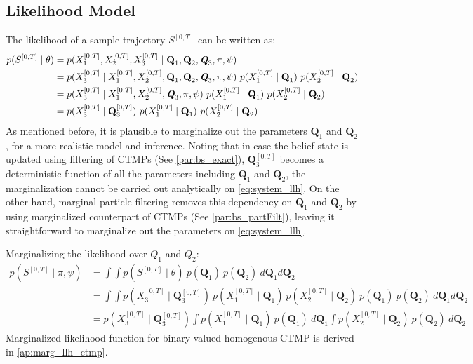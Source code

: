 \subsection{Likelihood Model}
 The likelihood of a sample trajectory $ S^{[0,T]} $ can be written as:
\begin{align}
p(S^{[0,T]} \mid \theta ) & = p(X_{1}^{[0, T]}, X_{2}^{[0, T]}, X_{3}^{[0, T]} \mid \textbf{Q}_{1}, \textbf{Q}_{2}, \textit{\textbf{Q}}_3, \pi, \psi) \nonumber\\
& = p(X_{3}^{[0, T]} \mid X_{1}^{[0, T]}, X_{2}^{[0, T]}, \textbf{Q}_{1}, \textbf{Q}_{2}, \textit{\textbf{Q}}_3, \pi, \psi) \ p(X_{1}^{[0, T]}\mid \textbf{Q}_{1}) \ p(X_{2}^{[0, T]}\mid \textbf{Q}_{2}) \nonumber\\ & = p(X_{3}^{[0, T]} \mid X_{1}^{[0, T]}, X_{2}^{[0, T]}, \textit{\textbf{Q}}_3, \pi, \psi) \ p(X_{1}^{[0, T]}\mid \textbf{Q}_{1}) \ p(X_{2}^{[0, T]}\mid \textbf{Q}_{2}) \nonumber\\ & = p(X_{3}^{[0, T]}\mid \textbf{Q}_{3}^{[0, T]}) \ p(X_{1}^{[0, T]}\mid \textbf{Q}_{1}) \ p(X_{2}^{[0, T]}\mid \textbf{Q}_{2}) 
\label{eq:system_llh}
\end{align}
As mentioned before, it is plausible to marginalize out the parameters $ \textbf{Q}_1 $ and $ \textbf{Q}_2 $, for a more realistic model and inference. Noting that in case the belief state is updated using filtering of CTMPs (See \cref{par:bs_exact}), $ \textbf{Q}_{3}^{[0, T]} $ becomes a deterministic function of all the parameters including $ \textbf{Q}_1 $ and $ \textbf{Q}_2 $, the marginalization cannot be carried out analytically on \autoref{eq:system_llh}. On the other hand, marginal particle filtering removes this dependency on $ \textbf{Q}_1 $ and $ \textbf{Q}_2 $ by using marginalized counterpart of CTMPs (See \cref{par:bs_partFilt}), leaving it straightforward to marginalize out the parameters on \autoref{eq:system_llh}.

Marginalizing the likelihood over $ Q_{1} $ and $ Q_{2} $:
\begin{align}
p(S^{[0,T]} \mid \pi, \psi ) & = 	\int \int p(S^{[0,T]} \mid \theta ) \ p(\textbf{Q}_{1}) \ p(\textbf{Q}_{2}) \ d\textbf{Q}_{1}d\textbf{Q}_{2} \nonumber\\ 
& = \int \int p(X_{3}^{[0, T]}\mid \textbf{Q}_{3}^{[0, T]}) \ p(X_{1}^{[0, T]}\mid \textbf{Q}_{1}) \ p(X_{2}^{[0, T]}\mid \textbf{Q}_{2}) \ p(\textbf{Q}_{1}) \ p(\textbf{Q}_{2})\ d\textbf{Q}_{1}d\textbf{Q}_{2} \nonumber\\ 
& = p(X_{3}^{[0, T]}\mid \textbf{Q}_{3}^{[0, T]}) \int  p(X_{1}^{[0, T]}\mid \textbf{Q}_{1}) \ p(\textbf{Q}_{1}) \ d\textbf{Q}_{1} \int p(X_{2}^{[0, T]}\mid \textbf{Q}_{2})\ p(\textbf{Q}_{2})\ d\textbf{Q}_{2}
\label{eq:Marg_llh}
\end{align}
Marginalized likelihood function for binary-valued homogenous CTMP is derived in \autoref{ap:marg_llh_ctmp}.

